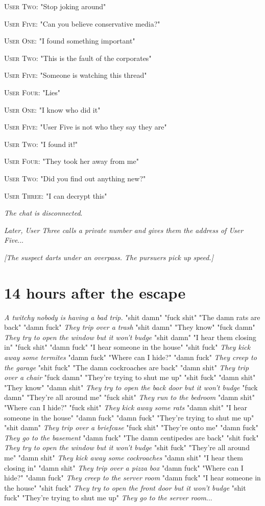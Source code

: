 \documentclass{report}
\begin{document}
\textsc{User Two}: "Stop joking around" 

\textsc{User Five}: "Can you believe conservative media?" 

\textsc{User One}: "I found something important" 

\textsc{User Two}: "This is the fault of the corporates" 

\textsc{User Five}: "Someone is watching this thread" 

\textsc{User Four}: "Lies" 

\textsc{User One}: "I know who did it" 

\textsc{User Five}: "User Five is not who they say they are" 

\textsc{User Two}: "I found it!" 

\textsc{User Four}: "They took her away from me" 

\textsc{User Two}: "Did you find out anything new?" 

\textsc{User Three}: "I can decrypt this" 

\textit{The chat is disconnected}. 

\textit{Later, User Three calls a private number and gives them the address of User Five}...

\textit{[The suspect darts under an overpass. The pursuers pick up speed.]}


\section*{14 \small{hours after the escape}}

\textit{A twitchy nobody is having a bad trip.} "shit damn" \textit{} "fuck shit" "The damn rats are back" "damn fuck" \textit{They trip over a trash} "shit damn" "They know" "fuck damn" \textit{They try to open the window but it won't budge} "shit damn" "I hear them closing in" "fuck shit" \textit{} "damn fuck" "I hear someone in the house" "shit fuck" \textit{They kick away some termites} "damn fuck" "Where can I hide?" "damn fuck" \textit{They creep to the garage} "shit fuck" "The damn cockroaches are back" "damn shit" \textit{They trip over a chair} "fuck damn" "They're trying to shut me up" "shit fuck" \textit{} "damn shit" "They know" "damn shit" \textit{They try to open the back door but it won't budge} "fuck damn" "They're all around me" "fuck shit" \textit{They run to the bedroom} "damn shit" "Where can I hide?" "fuck shit" \textit{They kick away some rats} "damn shit" "I hear someone in the house" "damn fuck" \textit{} "damn fuck" "They're trying to shut me up" "shit damn" \textit{They trip over a briefcase} "fuck shit" "They're onto me" "damn fuck" \textit{They go to the basement} "damn fuck" "The damn centipedes are back" "shit fuck" \textit{They try to open the window but it won't budge} "shit fuck" "They're all around me" "damn shit" \textit{They kick away some cockroaches} "damn shit" "I hear them closing in" "damn shit" \textit{They trip over a pizza box} "damn fuck" "Where can I hide?" "damn fuck" \textit{They creep to the server room} "damn fuck" "I hear someone in the house" "shit fuck" \textit{They try to open the front door but it won't budge} "shit fuck" "They're trying to shut me up" \textit{They go to the server room}...
\end{document}
